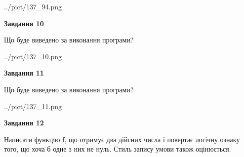 \documentclass[12pt, ukrainian]{article}
\begin{document}
{\begin {large}
\begin{center}
	{../pict/137_94.png}
\end{center}
\newpage

{\begin {center}\textbf{Завдання 10}\end {center}}

Що буде виведено за виконання програми?\par
\begin{center}
	{../pict/137_10.png}
\end{center}
\newpage

{\begin {center}\textbf{Завдання 11}\end {center}}

Що буде виведено за виконання програми?\par
\begin{center}
	{../pict/137_11.png}
\end{center}
\newpage

{\begin {center}\textbf{Завдання 12}\end {center}}


Написати функцiю f, що отримує два дійсних числа і повертає логічну ознаку того, що хоча б одне з них не нуль. Стиль запису умови також оцінюється.\par
\newpage

\end {large}}
\end{document}
